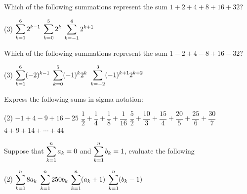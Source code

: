 \documentclass[mathNotesPreamble]{subfiles}
\begin{document}
  \begin{ex*}
    Which of the following summations represent the sum $1+2+4+8+16+32$?
    \begin{tasks}(3)
      \task $\ds\sum\kto^6 2^{k-1}$
      \task $\ds\sum\kto[0]^5 2^k$
      \task $\ds\sum\kto[-1]^4 2^{k+1}$
    \end{tasks}
  \end{ex*}
  
  \begin{ex*}
    Which of the following summations represent the sum $1-2+4-8+16-32$?
    \begin{tasks}(3)
      \task $\ds\sum\kto^6 (-2)^{k-1}$
      \task $\ds\sum\kto[0]^5 (-1)^k2^k$
      \task $\ds\sum\kto[-2]^3 (-1)^{k+1}2^{k+2}$
    \end{tasks}
  \end{ex*}
  \pagebreak
  
  \begin{ex*}
    Express the following sums in sigma notation:
  \end{ex*}
  \begin{tasks}[after-item-skip=\stretch{1}](2)
    \task $-1+4-9+16-25$
    \task $\dfrac{1}{2}+\dfrac{1}{4}+\dfrac{1}{8}+\dfrac{1}{16}$
    \task $\dfrac{5}{2}+\dfrac{10}{3}+\dfrac{15}{4}+\dfrac{20}{5}+\dfrac{25}{6}+\dfrac{30}{7}$
    \task $4+9+14+\cdots+44$
  \end{tasks}
  
  \begin{ex*}
    Suppose that $\Sum\kto^n a_k=0$ and $\Sum\kto^n b_k=1$, evaluate the following
  \end{ex*}
  \begin{tasks}[after-item-skip=\stretch{1}](2)
    \task $\ds\sum\kto^n 8a_k$
    \task $\ds\sum\kto^n 250b_k$
    \task $\ds\sum\kto^n (a_k+1)$
    \task $\ds\sum\kto^n (b_k-1)$
  \end{tasks}
  \pagebreak
  
  \noindent
  
\end{document}
